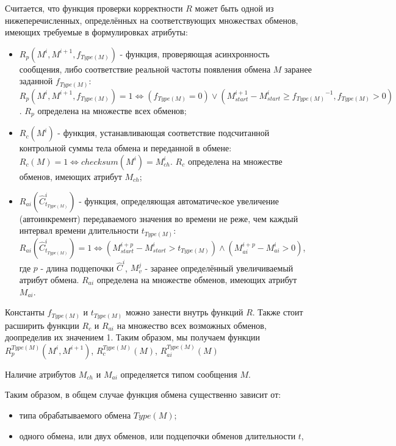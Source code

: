 Считается, что функция проверки корректности $R$ может быть одной из 
нижеперечисленных, определённых на соответствующих множествах обменов, 
имеющих требуемые в формулировках атрибуты:

\begin{itemize}
 \item $R_p(M^i, M^{i+1}, f_{Type(M)})$ - функция, проверяющая асинхронность 
сообщения, либо соответствие реальной частоты появления обмена $M$ заранее 
заданной $f_{Type(M)}$: $R_p(M^i, M^{i+1}, f_{Type(M)}) = 1 \Leftrightarrow 
(f_{Type(M)} = 0) \vee (M^{i+1}_{start} - M^i_{start} \geq 
{f_{Type(M)}}^{-1}, f_{Type(M)} > 0)$. $R_p$ определена на множестве всех 
обменов;

 \item $R_c(M^i)$ - функция, устанавливающая соответствие подсчитанной 
контрольной суммы тела обмена и переданной в обмене: $R_c(M) = 1 
\Leftrightarrow checksum(M^i) = M^i_{ch}$. $R_c$ определена на множестве 
обменов, имеющих атрибут $M_{ch}$;

 \item $R_{ai}(\hat{C}^i_{t_{Type(M)}})$ - функция, определяющая 
автоматичеcкое увеличение (автоинкремент) передаваемого значения во 
времени не реже, чем каждый интервал времени длительности $t_{Type(M)}$: 
$R_{ai}(\hat{C}^i_{t_{Type(M)}}) = 1 \Leftrightarrow (M^{i+p}_{start} - 
M^i_{start} > t_{Type(M)}) \wedge (M^{i+p}_{ai} - M^i_{ai} > 0)$, где $p$ - 
длина подцепочки $\hat{C}^i$, $M^j_v$ - заранее определённый увеличиваемый 
атрибут обмена. $R_{ai}$ определена на множестве обменов, имеющих атрибут 
$M_{ai}$.
\end{itemize}

Константы $f_{Type(M)}$ и $t_{Type(M)}$ можно занести внутрь функций $R$. Также 
стоит расширить функции $R_c$ и $R_{ai}$ на множество всех возможных обменов, 
доопределив их значением 1. Таким образом, мы получаем функции 
$R^{Type(M)}_p(M^{i}, M^{i+1})$, $R^{Type(M)}_c(M)$, $R^{Type(M)}_{ai}(M)$

Наличие атрибутов $M_{ch}$ и $M_{ai}$ определяется типом сообщения $M$.

Таким образом, в общем случае функция обмена существенно зависит от:

\begin{itemize}
 \item типа обрабатываемого обмена $Type(M)$;
 \item одного обмена, или двух обменов, или подцепочки обменов длительности $t$,
\end{itemize}

